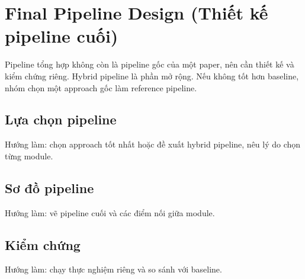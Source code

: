 \chapter{Final Pipeline Design (Thiết kế pipeline cuối)}

Pipeline tổng hợp không còn là pipeline gốc của một paper, nên cần thiết kế và kiểm chứng riêng.
Hybrid pipeline là phần mở rộng. Nếu không tốt hơn baseline, nhóm chọn một approach gốc làm reference pipeline.

\section{Lựa chọn pipeline}

Hướng làm: chọn approach tốt nhất hoặc đề xuất hybrid pipeline, nêu lý do chọn từng module.

\section{Sơ đồ pipeline}

Hướng làm: vẽ pipeline cuối và các điểm nối giữa module.

\section{Kiểm chứng}

Hướng làm: chạy thực nghiệm riêng và so sánh với baseline.
